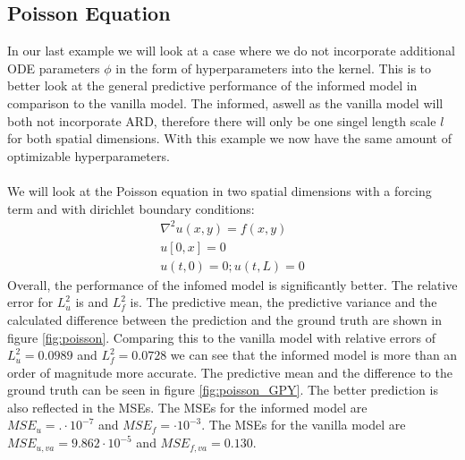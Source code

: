 \documentclass{article}
\begin{document}
\subsection{Poisson Equation}
In our last example we will look at a case where we do not incorporate additional ODE parameters $\phi$ in the form of hyperparameters into the kernel. This is to better look at the general predictive performance of the informed model in comparison to the vanilla model. The informed, aswell as the vanilla model will both not incorporate ARD, therefore there will only be one singel length scale $l$ for both spatial dimensions. With this example we now have the same amount of optimizable hyperparameters. \\
\\
 We will look at the Poisson equation in two spatial dimensions with a
forcing term and with dirichlet boundary conditions:
\begin{equation}
    \begin{aligned}
        \nabla^2 u(x,y) = f(x,y) \\ u[0,x] = 0 \\ u(t,0) = 0; u(t,L) = 0
    \end{aligned}
\end{equation}
 Overall, the performance of the infomed model is significantly better. The relative error for $L^2_u$ is and $L^2_f$ is. The predictive mean, the predictive variance and the calculated difference between the prediction and the ground truth are shown in figure \ref{fig:poisson}. Comparing this to the vanilla model with relative errors of $L^2_u = 0.0989$ and $L^2_f = 0.0728$ we can see that the informed model is more than an order of magnitude more accurate. The predictive mean and the difference to the ground truth can be seen in figure \ref{fig:poisson_GPY}. The better prediction is also reflected in the MSEs. The MSEs for the informed model are $MSE_u = . \cdot 10^{-7}$ and $MSE_f =  \cdot 10^{-3}$. The MSEs for the vanilla model are $MSE_{u,va} = 9.862  \cdot 10^{-5}$ and $MSE_{f,va} = 0.130$.\\
\\
\end{document}
